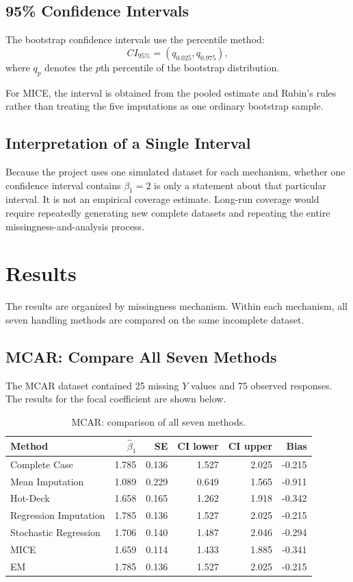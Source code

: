 \documentclass[11pt,a4paper]{article}
\begin{document}
\subsection{95\% Confidence Intervals}
The bootstrap confidence intervals use the percentile method:
\[
CI_{95\%}=\left(q_{0.025},q_{0.975}\right),
\]
where $q_p$ denotes the $p$th percentile of the bootstrap distribution.

For MICE, the interval is obtained from the pooled estimate and Rubin's rules rather than treating the five imputations as one ordinary bootstrap sample.

\subsection{Interpretation of a Single Interval}
Because the project uses one simulated dataset for each mechanism, whether one confidence interval contains $\beta_1=2$ is only a statement about that particular interval. It is not an empirical coverage estimate. Long-run coverage would require repeatedly generating new complete datasets and repeating the entire missingness-and-analysis process.

\section{Results}
The results are organized by missingness mechanism. Within each mechanism, all seven handling methods are compared on the same incomplete dataset.

\subsection{MCAR: Compare All Seven Methods}
The MCAR dataset contained 25 missing $Y$ values and 75 observed responses. The results for the focal coefficient are shown below.

\begin{table}[H]
\centering
\small
\caption{MCAR: comparison of all seven methods.}
\begin{tabular}{lrrrrr}
\toprule
Method & $\hat\beta_1$ & SE & CI lower & CI upper & Bias\\
\midrule
Complete Case & 1.785 & 0.136 & 1.527 & 2.025 & -0.215\\
Mean Imputation & 1.089 & 0.229 & 0.649 & 1.565 & -0.911\\
Hot-Deck & 1.658 & 0.165 & 1.262 & 1.918 & -0.342\\
Regression Imputation & 1.785 & 0.136 & 1.527 & 2.025 & -0.215\\
Stochastic Regression & 1.706 & 0.140 & 1.487 & 2.046 & -0.294\\
MICE & 1.659 & 0.114 & 1.433 & 1.885 & -0.341\\
EM & 1.785 & 0.136 & 1.527 & 2.025 & -0.215\\
\bottomrule
\end{tabular}
\end{table}
\end{document}
